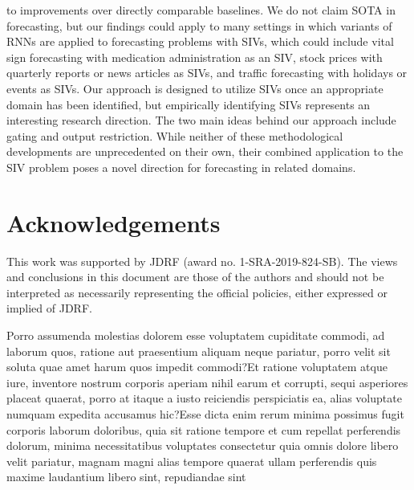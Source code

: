 \documentclass[letterpaper]{article}
\begin{document}
to improvements over directly comparable baselines. We do not claim SOTA in forecasting, but our findings could apply to many settings in which variants of RNNs are applied to forecasting problems with SIVs, which could include vital sign forecasting with medication administration as an SIV, stock prices with quarterly reports or news articles as SIVs, and  traffic forecasting with holidays or events as SIVs. Our approach is designed to utilize SIVs once an appropriate domain has been identified, but empirically identifying SIVs represents an interesting research direction. The two main ideas behind our approach include gating and output restriction. While neither of these methodological developments are unprecedented on their own, their combined application to the SIV problem poses a novel direction for forecasting in related domains.



\vspace{-3.02mm}
\section*{Acknowledgements} This work was supported by JDRF (award no. 1-SRA-2019-824-SB).  The views and conclusions in this document are those of the authors and should not be interpreted as necessarily representing the official policies, either expressed or implied of JDRF.


Porro assumenda molestias dolorem esse voluptatem cupiditate commodi, ad laborum quos, ratione aut praesentium aliquam neque pariatur, porro velit sit soluta quae amet harum quos impedit commodi?Et ratione voluptatem atque iure, inventore nostrum corporis aperiam nihil earum et corrupti, sequi asperiores placeat quaerat, porro at itaque a iusto reiciendis perspiciatis ea, alias voluptate numquam expedita accusamus hic?Esse dicta enim rerum minima possimus fugit corporis laborum doloribus, quia sit ratione tempore et cum repellat perferendis dolorum, minima necessitatibus voluptates consectetur quia omnis dolore libero velit pariatur, magnam magni alias tempore quaerat ullam perferendis quis maxime laudantium libero sint, repudiandae sint

\end{document}
